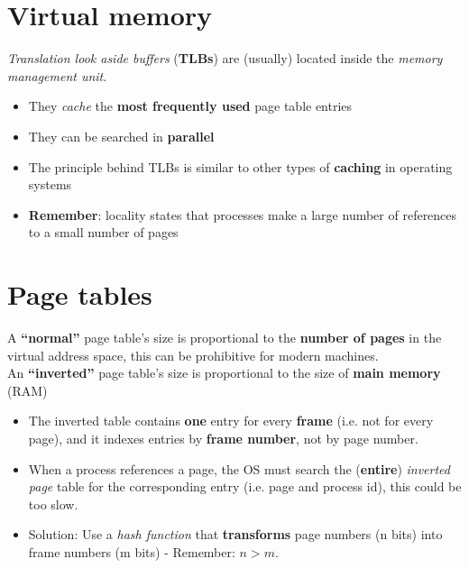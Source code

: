 \documentclass{article}
\begin{document}
\section{Virtual memory}
\begin{flushleft}
\textit{Translation look aside buffers} (\textbf{TLBs}) are (usually) located inside the \textit{memory management unit}.
\begin{itemize}
	\item They \textit{cache} the \textbf{most frequently used} page table entries
	\item They can be searched in \textbf{parallel}
	\item The principle behind TLBs is similar to other types of \textbf{caching} in operating systems
	\item \textbf{Remember}: locality states that processes make a large number of references to a small number of pages
\end{itemize}
\end{flushleft}

\section{Page tables}
\begin{flushleft}
A \textbf{“normal”} page table’s size is proportional to the \textbf{number of pages} in the virtual address space, this can be prohibitive for modern machines.\\
An \textbf{“inverted”} page table’s size is proportional to the size of \textbf{main memory} (RAM)
\begin{itemize}
	\item The inverted table contains \textbf{one} entry for every \textbf{frame} (i.e. not for every page), and it indexes entries by \textbf{frame number}, not by page number.
	\item When a process references a page, the OS must search the (\textbf{entire}) \textit{inverted page} table for the corresponding entry (i.e. page and process id), this could be too slow.
	\item Solution: Use a \textit{hash function} that \textbf{transforms} page numbers (n bits) into frame numbers (m bits) - Remember: $n > m$.
\end{itemize}
\end{flushleft}
\end{document}
